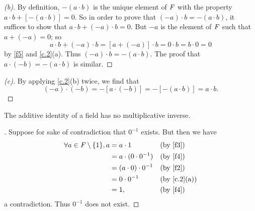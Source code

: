 \begin{proof}[(b)]
  By definition, \(-(a \cdot b)\) is the unique element of \(\mathit{F}\) with the property \(a \cdot b + [-(a \cdot b)] = 0\).
  So in order to prove that \((-a) \cdot b = -(a \cdot b)\), it suffices to show that \(a \cdot b + (-a) \cdot b = 0\).
  But \(-a\) is the element of \(\mathit{F}\) such that \(a + (-a) = 0\);
  so
  \[
    a \cdot b + (-a) \cdot b = [a + (-a)] \cdot b = 0 \cdot b = b  \cdot 0 = 0
  \]
  by \ref{f5} and \cref{c.2}(a).
  Thus \((-a) \cdot b = -(a \cdot b)\).
  The proof that \(a \cdot (-b) = -(a \cdot b)\) is similar.
\end{proof}

\begin{proof}[(c)]
  By applying \cref{c.2}(b) twice, we find that
  \[
    (-a) \cdot (-b) = -[a \cdot (-b)] = -[-(a \cdot b)] = a \cdot b.
  \]
\end{proof}

\begin{cor}\label{c.0.8}
  The additive identity of a field has no multiplicative inverse.
\end{cor}

\begin{proof}[]
  Suppose for sake of contradiction that \(0^{-1}\) exists.
  But then we have
  \begin{align*}
    \forall a \in \F \setminus \set{1}, a & = a \cdot 1                &  & \text{(by \ref{f3})}      \\
                                          & = a \cdot (0 \cdot 0^{-1}) &  & \text{(by \ref{f4})}      \\
                                          & = (a \cdot 0) \cdot 0^{-1} &  & \text{(by \ref{f2})}      \\
                                          & = 0 \cdot 0^{-1}           &  & \text{(by \cref{c.2}(a))} \\
                                          & = 1,                       &  & \text{(by \ref{f4})}
  \end{align*}
  a contradiction.
  Thus \(0^{-1}\) does not exist.
\end{proof}

